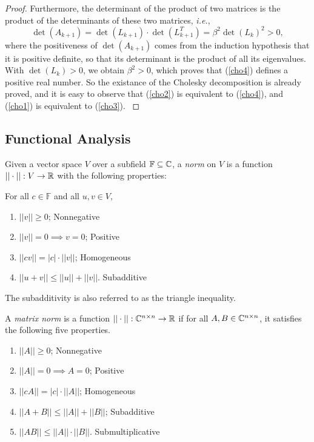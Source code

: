 \begin{proof}
Furthermore, the determinant of the product of two matrices is the product of the determinants of these two matrices, \textit{i.e.},
\[ \det(A_{k+1})=\det(L_{k+1})\cdot\det(L_{k+1}^T)=\beta^2\det(L_k)^2>0, \]
where the positiveness of \(\det(A_{k+1})\) comes from the induction hypothesis that it is positive definite, so that its determinant is the product of all its eigenvalues.
With \(\det(L_k)>0\), we obtain \(\beta^2>0\), which proves that (\ref{cho4}) defines a positive real number.
So the existance of the Cholesky decomposition is already proved, and it is easy to observe that (\ref{cho2}) is equivalent to (\ref{cho4}), and (\ref{cho1}) is equivalent to (\ref{cho3}).
\cite{tam37}
\end{proof}



\subsection{Functional Analysis}
\begin{definition}[Norm]
Given a vector space $V$ over a subfield \(\mathbb{F}\subseteq\mathbb{C}\), a \emph{norm} on $V$ is a function \(||\cdot||:V\to\mathbb{R}\) with the following properties:
\item For all \(c\in\mathbb{F}\) and all \(u,v\in V\),
\begin{enumerate}
	\item \(||v||\geq0\); \hfill Nonnegative
	\item \(||v||=0\implies v=0\); \hfill Positive
	\item \(||cv||=|c|\cdot||v||\); \hfill Homogeneous
	\item \(||u+v||\leq||u||+||v||\). \hfill Subadditive
\end{enumerate}
The subadditivity is also referred to as the triangle inequality.
\end{definition}


\begin{definition}
A \emph{matrix norm} is a function \(||\cdot||:\mathbb{C}^{n\times n}\to\mathbb{R}\) if for all \(A,B\in\mathbb{C}^{n\times n}\), it satisfies the following five properties.
\begin{enumerate}
	\item \(||A||\geq0\); \hfill Nonnegative
	\item \(||A||=0\implies A=0\); \hfill Positive
	\item \(||cA||=|c|\cdot||A||\); \hfill Homogeneous
	\item \(||A+B||\leq||A||+||B||\); \hfill Subadditive
	\item \(||AB||\leq||A||\cdot||B||\). \hfill Submultiplicative
\end{enumerate}
\cite{horn}
\end{definition}



